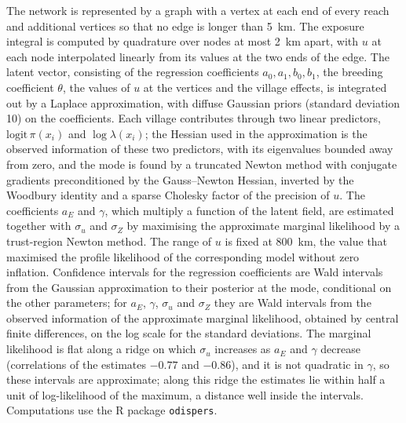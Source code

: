 \documentclass[11pt,a4paper]{article}
\begin{document}
The network is represented by a graph with a vertex at each end of every reach and additional vertices so that no edge is longer than 5~km. The exposure integral is computed by quadrature over nodes at most 2~km apart, with $u$ at each node interpolated linearly from its values at the two ends of the edge. The latent vector, consisting of the regression coefficients $a_0, a_1, b_0, b_1$, the breeding coefficient $\theta$, the values of $u$ at the vertices and the village effects, is integrated out by a Laplace approximation, with diffuse Gaussian priors (standard deviation 10) on the coefficients. Each village contributes through two linear predictors, $\mathrm{logit}\,\pi(x_i)$ and $\log\lambda(x_i)$; the Hessian used in the approximation is the observed information of these two predictors, with its eigenvalues bounded away from zero, and the mode is found by a truncated Newton method \citep{steihaug1983} with conjugate gradients preconditioned by the Gauss--Newton Hessian, inverted by the Woodbury identity and a sparse Cholesky factor of the precision of $u$. The coefficients $a_E$ and $\gamma$, which multiply a function of the latent field, are estimated together with $\sigma_u$ and $\sigma_Z$ by maximising the approximate marginal likelihood by a trust-region Newton method. The range of $u$ is fixed at 800~km, the value that maximised the profile likelihood of the corresponding model without zero inflation. Confidence intervals for the regression coefficients are Wald intervals from the Gaussian approximation to their posterior at the mode, conditional on the other parameters; for $a_E$, $\gamma$, $\sigma_u$ and $\sigma_Z$ they are Wald intervals from the observed information of the approximate marginal likelihood, obtained by central finite differences, on the log scale for the standard deviations. The marginal likelihood is flat along a ridge on which $\sigma_u$ increases as $a_E$ and $\gamma$ decrease (correlations of the estimates $-0.77$ and $-0.86$), and it is not quadratic in $\gamma$, so these intervals are approximate; along this ridge the estimates lie within half a unit of log-likelihood of the maximum, a distance well inside the intervals. Computations use the R package \texttt{odispers}.
\end{document}
